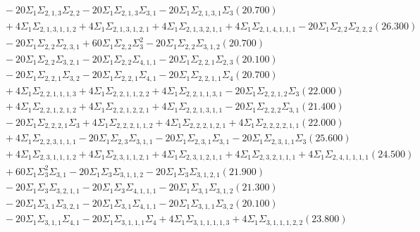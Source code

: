 \documentclass[12pt]{article}
\begin{document}
\begin{landscape}
\begin{align*}
		&\quad\quad -20\Sigma_{1}\Sigma_{2,1,3}\Sigma_{2,2}-20\Sigma_{1}\Sigma_{2,1,3}\Sigma_{3,1}-20\Sigma_{1}\Sigma_{2,1,3,1}\Sigma_{3}(20.700) \\ 
		&\quad\quad +4\Sigma_{1}\Sigma_{2,1,3,1,1,2}+4\Sigma_{1}\Sigma_{2,1,3,1,2,1}+4\Sigma_{1}\Sigma_{2,1,3,2,1,1}+4\Sigma_{1}\Sigma_{2,1,4,1,1,1}-20\Sigma_{1}\Sigma_{2,2}\Sigma_{2,2,2}(26.300) \\ 
		&\quad\quad -20\Sigma_{1}\Sigma_{2,2}\Sigma_{2,3,1}+60\Sigma_{1}\Sigma_{2,2}\Sigma_{3}^{2}-20\Sigma_{1}\Sigma_{2,2}\Sigma_{3,1,2}(20.700) \\ 
		&\quad\quad -20\Sigma_{1}\Sigma_{2,2}\Sigma_{3,2,1}-20\Sigma_{1}\Sigma_{2,2}\Sigma_{4,1,1}-20\Sigma_{1}\Sigma_{2,2,1}\Sigma_{2,3}(20.100) \\ 
		&\quad\quad -20\Sigma_{1}\Sigma_{2,2,1}\Sigma_{3,2}-20\Sigma_{1}\Sigma_{2,2,1}\Sigma_{4,1}-20\Sigma_{1}\Sigma_{2,2,1,1}\Sigma_{4}(20.700) \\ 
		&\quad\quad +4\Sigma_{1}\Sigma_{2,2,1,1,1,3}+4\Sigma_{1}\Sigma_{2,2,1,1,2,2}+4\Sigma_{1}\Sigma_{2,2,1,1,3,1}-20\Sigma_{1}\Sigma_{2,2,1,2}\Sigma_{3}(22.000) \\ 
		&\quad\quad +4\Sigma_{1}\Sigma_{2,2,1,2,1,2}+4\Sigma_{1}\Sigma_{2,2,1,2,2,1}+4\Sigma_{1}\Sigma_{2,2,1,3,1,1}-20\Sigma_{1}\Sigma_{2,2,2}\Sigma_{3,1}(21.400) \\ 
		&\quad\quad -20\Sigma_{1}\Sigma_{2,2,2,1}\Sigma_{3}+4\Sigma_{1}\Sigma_{2,2,2,1,1,2}+4\Sigma_{1}\Sigma_{2,2,2,1,2,1}+4\Sigma_{1}\Sigma_{2,2,2,2,1,1}(22.000) \\ 
		&\quad\quad +4\Sigma_{1}\Sigma_{2,2,3,1,1,1}-20\Sigma_{1}\Sigma_{2,3}\Sigma_{3,1,1}-20\Sigma_{1}\Sigma_{2,3,1}\Sigma_{3,1}-20\Sigma_{1}\Sigma_{2,3,1,1}\Sigma_{3}(25.600) \\ 
		&\quad\quad +4\Sigma_{1}\Sigma_{2,3,1,1,1,2}+4\Sigma_{1}\Sigma_{2,3,1,1,2,1}+4\Sigma_{1}\Sigma_{2,3,1,2,1,1}+4\Sigma_{1}\Sigma_{2,3,2,1,1,1}+4\Sigma_{1}\Sigma_{2,4,1,1,1,1}(24.500) \\ 
		&\quad\quad +60\Sigma_{1}\Sigma_{3}^{2}\Sigma_{3,1}-20\Sigma_{1}\Sigma_{3}\Sigma_{3,1,1,2}-20\Sigma_{1}\Sigma_{3}\Sigma_{3,1,2,1}(21.900) \\ 
		&\quad\quad -20\Sigma_{1}\Sigma_{3}\Sigma_{3,2,1,1}-20\Sigma_{1}\Sigma_{3}\Sigma_{4,1,1,1}-20\Sigma_{1}\Sigma_{3,1}\Sigma_{3,1,2}(21.300) \\ 
		&\quad\quad -20\Sigma_{1}\Sigma_{3,1}\Sigma_{3,2,1}-20\Sigma_{1}\Sigma_{3,1}\Sigma_{4,1,1}-20\Sigma_{1}\Sigma_{3,1,1}\Sigma_{3,2}(20.100) \\ 
		&\quad\quad -20\Sigma_{1}\Sigma_{3,1,1}\Sigma_{4,1}-20\Sigma_{1}\Sigma_{3,1,1,1}\Sigma_{4}+4\Sigma_{1}\Sigma_{3,1,1,1,1,3}+4\Sigma_{1}\Sigma_{3,1,1,1,2,2}(23.800) \\ 

\end{align*}
\end{landscape}
\end{document}
